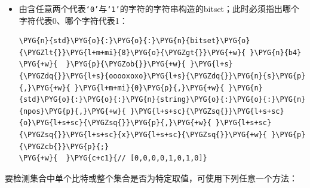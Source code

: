 \begin{itemize}

\item 由含任意两个代表\texttt{‘0’}与\texttt{‘1’}的字符的字符串构造的bitset；此时必须指出哪个字符代表0、哪个字符代表1：



\begin{codeblockbg}
\begin{Verbatim}[commandchars=\\\{\},breaklines=true,breakanywhere=true,fontsize=\codefont,xleftmargin=17bp]
\PYG{n}{std}\PYG{o}{:}\PYG{o}{:}\PYG{n}{bitset}\PYG{o}{\PYGZlt{}}\PYG{l+m+mi}{8}\PYG{o}{\PYGZgt{}}\PYG{+w}{ }\PYG{n}{b4}
\PYG{+w}{  }\PYG{p}{\PYGZob{}}\PYG{+w}{ }\PYG{l+s}{\PYGZdq{}}\PYG{l+s}{ooooxoxo}\PYG{l+s}{\PYGZdq{}}\PYG{n}{s}\PYG{p}{,}\PYG{+w}{ }\PYG{l+m+mi}{0}\PYG{p}{,}\PYG{+w}{ }\PYG{n}{std}\PYG{o}{:}\PYG{o}{:}\PYG{n}{string}\PYG{o}{:}\PYG{o}{:}\PYG{n}{npos}\PYG{p}{,}\PYG{+w}{ }\PYG{l+s+sc}{\PYGZsq{}}\PYG{l+s+sc}{o}\PYG{l+s+sc}{\PYGZsq{}}\PYG{p}{,}\PYG{+w}{ }\PYG{l+s+sc}{\PYGZsq{}}\PYG{l+s+sc}{x}\PYG{l+s+sc}{\PYGZsq{}}\PYG{+w}{ }\PYG{p}{\PYGZcb{}}\PYG{p}{;}
\PYG{+w}{  }\PYG{c+c1}{// [0,0,0,0,1,0,1,0]}
\end{Verbatim}
\end{codeblockbg}

\end{itemize}



要检测集合中单个比特或整个集合是否为特定取值，可使用下列任意一个方法：



